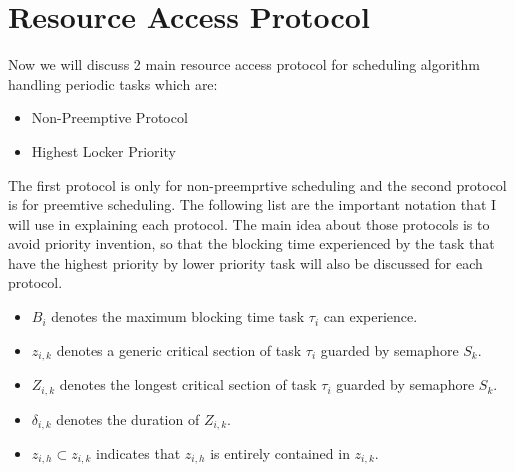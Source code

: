 \section{Resource Access Protocol}

Now we will discuss 2 main resource access protocol for scheduling algorithm handling periodic tasks which are:

\begin{itemize}
\item Non-Preemptive Protocol
\item Highest Locker Priority

\end{itemize}

The first protocol is only for non-preemprtive scheduling and the second protocol is for preemtive scheduling. The following list are the important notation that I will use in explaining each protocol. The main idea about those protocols is to avoid priority invention, so that the blocking time experienced by the task that have the highest priority by lower priority task will also be discussed for each protocol.

\begin{itemize}
\item $ B_{i} $ denotes the maximum blocking time task $ \tau_{i} $ can experience.
\item $ z_{i,k} $ denotes a generic critical section of task $ \tau_{i} $ guarded by semaphore $ S_{k} $.
\item  $ Z_{i,k} $ denotes the longest critical section of task $ \tau_{i} $ guarded by semaphore $ S_{k} $.
\item $ \delta_{i,k} $ denotes the duration of $ Z_{i,k} $.
\item $ z_{i,h} \subset z_{i,k} $ indicates that $ z_{i,h} $ is entirely contained in $ z_{i,k} $.
\end{itemize}






